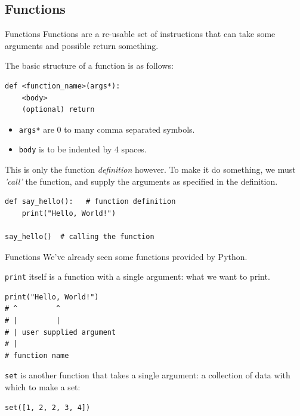 \documentclass[10pt]{beamer}
\begin{document}
\subsection{Functions}
\label{sec:org61b7f5b}
\begin{frame}[label={sec:org892f4ac},fragile]{Functions}
 Functions are a re-usable set of instructions that can take some arguments and
possible return something.

The basic structure of a function is as follows:

\begin{verbatim}
def <function_name>(args*):
    <body>
    (optional) return
\end{verbatim}

\begin{itemize}
\item \texttt{args*} are 0 to many comma separated symbols.
\item \texttt{body} is to be indented by 4 spaces.
\end{itemize}

This is only the function \emph{definition} however. To make it do something, we must \emph{'call'}
the function, and supply the arguments as specified in the definition.

\begin{verbatim}
def say_hello():   # function definition
    print("Hello, World!")

say_hello()  # calling the function
\end{verbatim}
\end{frame}

\begin{frame}[label={sec:orgbfd7f3f},fragile]{Functions}
 We've already seen some functions provided by Python.

\texttt{print} itself is a function with a single argument: what we want to print.

\begin{verbatim}
print("Hello, World!")
# ^         ^
# |         |
# | user supplied argument
# |
# function name 
\end{verbatim}

\texttt{set} is another function that takes a single argument: a collection of data with which
to make a set:

\begin{verbatim}
set([1, 2, 2, 3, 4])
\end{verbatim}
\end{frame}
\end{document}
